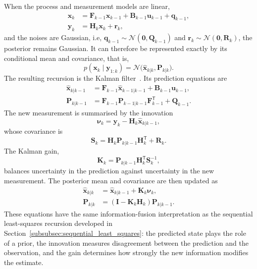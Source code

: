 \documentclass[11pt,oneside,openany]{book}
\begin{document}
When the process and measurement models are linear,
\begin{subequations}
\begin{align}
\mathbf{x}_k &= \mathbf{F}_{k-1}\mathbf{x}_{k-1} +\mathbf{B}_{k-1}\mathbf{u}_{k-1} + \mathbf{q}_{k-1}, \label{eq:kf_linear_process}\\
\mathbf{y}_k &= \mathbf{H}_k\mathbf{x}_k+\mathbf{r}_k,
\label{eq:kf_linear_measurement}
\end{align}    
\end{subequations}
and the noises are Gaussian, i.e, $\mathbf{q}_{k-1}\sim \mathcal{N}(\mathbf{0},\mathbf{Q}_{k-1})$ and $\mathbf{r}_k\sim \mathcal{N}(\mathbf{0},\mathbf{R}_k)$, the posterior remains Gaussian. It can therefore be represented exactly by its conditional mean and covariance, that is,
\begin{equation}
p(\mathbf{x}_k\mid\mathbf{y}_{1:k}) = \mathcal{N} \bigl(\widehat{\mathbf{x}}_{k|k}, \mathbf{P}_{k|k} \bigr).
\end{equation}
The resulting recursion is the Kalman filter~\cite{kalman_1960}. Its
prediction equations are
\begin{align}
\widehat{\mathbf{x}}_{k|k-1}
&=
\mathbf{F}_{k-1}\widehat{\mathbf{x}}_{k-1|k-1}
+
\mathbf{B}_{k-1}\mathbf{u}_{k-1},
\label{eq:kf_state_prediction}\\
\mathbf{P}_{k|k-1}
&=
\mathbf{F}_{k-1}\mathbf{P}_{k-1|k-1}
\mathbf{F}_{k-1}^{\mathsf T}
+
\mathbf{Q}_{k-1}.
\label{eq:kf_cov_prediction}
\end{align}
The new measurement is summarised by the innovation
\begin{equation}
\boldsymbol{\nu}_k
=
\mathbf{y}_k-
\mathbf{H}_k\widehat{\mathbf{x}}_{k|k-1},
\label{eq:kf_innovation}
\end{equation}
whose covariance is
\begin{equation}
\mathbf{S}_k
=
\mathbf{H}_k\mathbf{P}_{k|k-1}\mathbf{H}_k^{\mathsf T}
+
\mathbf{R}_k.
\label{eq:kf_innovation_covariance}
\end{equation}
The Kalman gain,
\begin{equation}
\mathbf{K}_k
=
\mathbf{P}_{k|k-1}\mathbf{H}_k^{\mathsf T}
\mathbf{S}_k^{-1},
\label{eq:kf_gain}
\end{equation}
balances uncertainty in the prediction against uncertainty in the new
measurement. The posterior mean and covariance are then updated as
\begin{align}
\widehat{\mathbf{x}}_{k|k} &= \widehat{\mathbf{x}}_{k|k-1} + \mathbf{K}_k\boldsymbol{\nu}_k, \label{eq:kf_state_update}\\
\mathbf{P}_{k|k} &= (\mathbf{I}-\mathbf{K}_k\mathbf{H}_k) \mathbf{P}_{k|k-1}. \label{eq:kf_cov_update}
\end{align} 
These equations have the same information-fusion interpretation as the sequential least-squares recursion developed in Section~\ref{subsubsec:sequential_least_squares}: the predicted state plays the role of a prior, the innovation measures disagreement between the prediction and the observation, and the gain determines how strongly the new information modifies the estimate.
\end{document}

